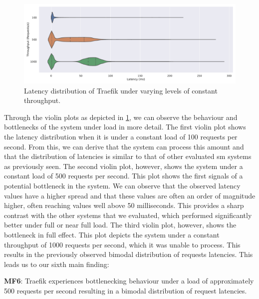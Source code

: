 \begin{figure}[!t]
    \centering
    
    \includegraphics[width=1\linewidth]{5_experimental_evaluation/figures/exp-02-bottleneck-traefik.pdf}

    \caption[Latency distribution of Traefik under varying levels of constant throughput]{Latency distribution of Traefik under varying levels of constant throughput.}
    
    \label{fig:exp:02:traefik-bottleneck}
\end{figure}

Through the violin plots as depicted in \cref{fig:exp:02:traefik-bottleneck}, we can observe the behaviour and bottlenecks of the system under load in more detail. The first violin plot shows the latency distribution when it is under a constant load of 100 requests per second. From this, we can derive that the system can process this amount and that the distribution of latencies is similar to that of other evaluated \gls{sm} systems as previously seen. The second violin plot, however, shows the system under a constant load of 500 requests per second. This plot shows the first signals of a potential bottleneck in the system. We can observe that the observed latency values have a higher spread and that these values are often an order of magnitude higher, often reaching values well above 50 milliseconds. This provides a sharp contrast with the other systems that we evaluated, which performed significantly better under full or near full load. The third violin plot, however, shows the bottleneck in full effect. This plot depicts the system under a constant throughput of 1000 requests per second, which it was unable to process. This results in the previously observed bimodal distribution of requests latencies. This leads us to our sixth main finding:


\begin{shaded*}
    \noindent
    \textbf{MF6}: 
    Traefik experiences bottlenecking behaviour under a load of approximately 500 requests per second resulting in a bimodal distribution of request latencies.
\end{shaded*}


